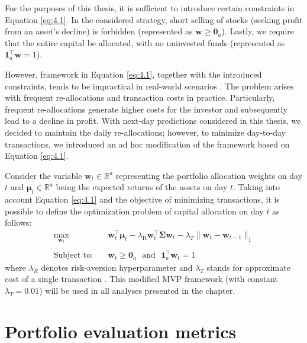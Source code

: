 For the purposes of this thesis, it is sufficient to introduce certain constraints in Equation \eqref{eq:4.1}. In the considered strategy, short selling of stocks (seeking profit from an asset's decline) is forbidden
(represented as $\mathbf{w} \geq \mathbf{0}_a$). Lastly, we require that the entire capital be allocated, with no uninvested funds (represented as $\mathbf{1}_a^{\top}\mathbf{w}=1$).

However, framework in Equation \eqref{eq:4.1}, together with the introduced constraints, tends to be impractical in real-world scenarios \cite{portfolio}. The problem arises with frequent re-allocations
and transaction costs in practice. Particularly, frequent re-allocations generate higher costs for the investor and subsequently lead to a decline in profit. With next-day predictions
considered in this thesis, we decided to maintain the daily re-allocations; however, to minimize day-to-day transactions, we introduced an ad hoc modification of the framework based on Equation \eqref{eq:4.1}.

Consider the variable $\mathbf{w}_t \in \mathbb{R}^a$ representing the portfolio allocation weights on day $t$ and $\bm{\mu}_t \in \mathbb{R}^a$ being the expected returns 
of the assets on day $t$. Taking into account Equation \eqref{eq:4.1} and the objective of minimizing transactions, it is possible to define the optimization problem of capital allocation on day $t$ as follows:
\begin{equation}
\begin{aligned}
\max_{\mathbf{w}_t} \quad 
& \mathbf{w}_t^{\top}\bm{\mu}_t 
- \lambda_{\text{R}} \mathbf{w}_t^{\top}\bm{\Sigma}\mathbf{w}_t 
- \lambda_{T} \|\mathbf{w}_t - \mathbf{w}_{t-1}\|_1 \\
\\
\text{Subject to:} \quad 
& \mathbf{w}_t \geq \mathbf{0}_a \>\>\> \text{and} \>\>\> \mathbf{1}_a^{\top}\mathbf{w}_t=1
\label{eq:4.2}
\end{aligned}
\end{equation}
where $\lambda_R$ denotes risk-aversion hyperparameter and $\lambda_T$ stands for approximate cost of a single transaction \cite{portfolio}. This modified MVP framework (with constant $\lambda_T = 0.01$) will be used in all analyses presented in the chapter.

\section{Portfolio evaluation metrics}

